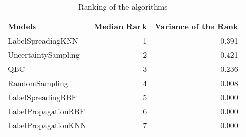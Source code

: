 \begin{table}[!h]

\caption{\label{tab:rankingaggregated}Ranking of the algorithms}
\centering
\begin{tabular}[t]{lrr}
\toprule
Models & Median Rank & Variance of the Rank\\
\midrule
LabelSpreadingKNN & 1 & 0.391\\
UncertaintySampling & 2 & 0.421\\
QBC & 3 & 0.236\\
RandomSampling & 4 & 0.008\\
LabelSpreadingRBF & 5 & 0.000\\
LabelPropagationRBF & 6 & 0.000\\
LabelPropagationKNN & 7 & 0.000\\
\bottomrule
\end{tabular}
\end{table}
